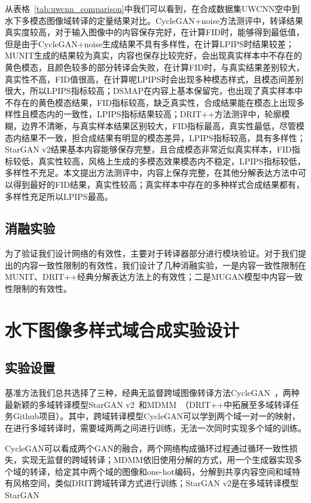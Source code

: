 从表格~\ref{tab:uwcnn_comparison}中我们可以看到，在合成数据集UWCNN空中到水下多模态图像域转译的定量结果对比。CycleGAN+noise方法测评中，转译结果真实度较高，对于输入图像中的内容保存完好，在计算FID时，能够得到最低值，但是由于CycleGAN+noise生成结果不具有多样性，在计算LPIPS时结果较差；MUNIT生成的结果较为真实，内容也保存比较完好，会出现真实样本中不存在的黄色模态，且颜色较多的部分转译会失败，在计算FID时，与真实结果差别较大，真实性不高，FID值很高，在计算呢LPIPS时会出现多种模态样式，且模态间差别很大，所以LPIPS指标较高；DSMAP在内容上基本保留完，也出现了真实样本中不存在的黄色模态结果，FID指标较高，缺乏真实性，合成结果能在模态上出现多样性且模态内的一致性，LPIPS指标结果较高；DRIT++方法测评中，轮廓模糊，边界不清晰，与真实样本结果区别较大，FID指标最高，真实性最低，尽管模态内结果不一致，担合成结果有明显的模态差异，LPIPS指标较高，具有多样性；StarGAN v2结果基本内容能够保存完整，且合成模态非常近似真实样本，FID指标较低，真实性较高，风格上生成的多模态效果模态内不稳定，LPIPS指标较低，多样性不充足。本文提出方法测评中，内容上保存完整，在其他分解表达方法中可以得到最好的FID结果，真实性较高；真实样本中存在的多种样式合成结果都有，多样性充足所以LPIPS最高。

\subsection{消融实验}

为了验证我们设计网络的有效性，主要对于转译器部分进行模块验证。对于我们提出的内容一致性限制的有效性，我们设计了几种消融实验，一是内容一致性限制在MUNIT、DRIT++经典分解表达方法上的有效性；二是MUGAN模型中内容一致性限制的有效性。




\section{水下图像多样式域合成实验设计}
\subsection{实验设置}
基准方法我们总共选择了三种，经典无监督跨域图像转译方法CycleGAN~\cite{zhu2017unpaired}，两种最新颖的多域转译模型StarGAN v2~\cite{choi2020stargan}和MDMM~\cite{lee2020drit++}（DRIT++中拓展至多域转译任务Github项目）。其中，跨域转译模型CycleGAN可以学到两个域一对一的映射，在进行多域转译时，需要域两两之间进行训练，无法一次同时实现多个域的训练。

CycleGAN可以看成两个GAN的融合，两个网络构成循环过程通过循环一致性损失，实现无监督的跨域转译；MDMM依旧使用分解的方式，用一个生成器实现多个域的转译，给定其中两个域的图像和one-hot编码，分解到共享内容空间和域特有风格空间，类似DRIT跨域转译方式进行训练；StarGAN v2是在多域转译模型StarGAN

